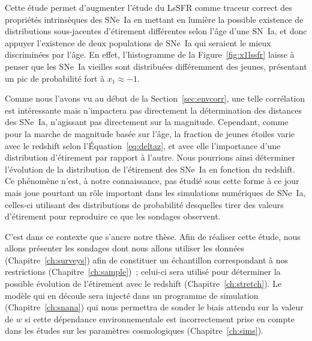 \documentclass[../main/main.tex]{subfiles}
\begin{document}
Cette étude permet d'augmenter l'étude du LsSFR comme traceur correct des
propriétés intrinsèques des SNe~Ia en mettant en lumière la possible existence
de distributions sous-jacentes d'étirement différentes selon l'âge d'une SN~Ia,
et donc appuyer l'existence de deux populations de SNe~Ia qui seraient le mieux
discriminées par l'âge. En effet, l'histogramme de la Figure~\ref{fig:x1lssfr}
laisse à penser que les SNe~Ia vieilles sont distribuées différemment des
jeunes, présentant un pic de probabilité fort à $x_1 \approx -1$.

Comme nous l'avons vu au début de la Section~\ref{sec:envcorr}, une telle
corrélation est intéressante mais n'impactera pas directement la détermination
des distances des SNe~Ia, n'agissant pas directement sur la magnitude.
Cependant, comme pour la marche de magnitude basée sur l'âge, la fraction de
jeunes étoiles varie avec le redshift selon l'Équation~\ref{eq:deltaz}, et avec
elle l'importance d'une distribution d'étirement par rapport à l'autre. Nous
pourrions ainsi déterminer l'évolution de la distribution de l'étirement des
SNe~Ia en fonction du redshift. Ce phénomène n'est, à notre connaissance, pas
étudié sous cette forme à ce jour mais joue pourtant un rôle important dans les
simulations numériques de SNe~Ia, celles-ci utilisant des distributions de
probabilité desquelles tirer des valeurs d'étirement pour reproduire ce que les
sondages observent.

C'est dans ce contexte que s'ancre notre thèse. Afin de réaliser cette étude,
nous allons présenter les sondages dont nous allons utiliser les données
(Chapitre~\ref{ch:surveys}) afin de constituer un échantillon correspondant à
nos restrictions (Chapitre~\ref{ch:sample})~; celui-ci sera utilisé pour
déterminer la possible évolution de l'étirement avec le redshift
(Chapitre~\ref{ch:stretch}). Le modèle qui en découle sera injecté dans un
programme de simulation (Chapitre~\ref{ch:snana}) qui nous permettra de sonder
le biais attendu sur la valeur de $w$ si cette dépendance environnementale est
incorrectement prise en compte dans les études sur les paramètres cosmologiques
(Chapitre~\ref{ch:sims}).

\clearpage

\thispagestyle{plain}
\vfill
\minilof
\vfill
\minilot
\vfill

% 
% 
\end{document}
